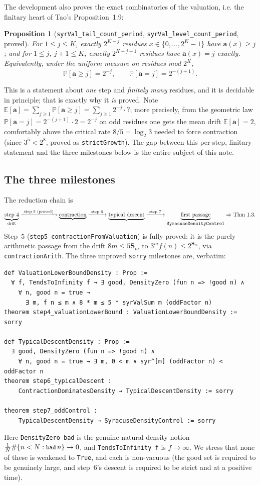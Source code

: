 \documentclass[11pt]{article}
\theoremstyle{plain}
\newtheorem{prop}[thm]{Proposition}
\theoremstyle{definition}
\theoremstyle{remark}
\newcommand{\aval}{\mathbf{a}}
\newcommand{\Ssum}{\mathbf{S}}
\newcommand{\E}{\mathbb{E}}
\newcommand{\Prob}{\mathbb{P}}
\newcommand{\code}[1]{\texttt{\small #1}}
\begin{document}
The development also proves the exact combinatorics of the valuation, i.e. the
finitary heart of Tao's Proposition~1.9:
\begin{prop}[\code{syrVal\_tail\_count\_period}, \code{syrVal\_level\_count\_period}, proved]
\label{prop:dist}
For $1\le j\le K$, exactly $2^{K-j}$ residues $x\in\{0,\dots,2^K-1\}$ have
$\aval(x)\ge j$; and for $1\le j$, $j+1\le K$, exactly $2^{K-j-1}$ residues have
$\aval(x)=j$ exactly. Equivalently, under the uniform measure on residues mod
$2^K$,
\[
  \Prob[\aval\ge j]=2^{-j},\qquad \Prob[\aval=j]=2^{-(j+1)}.
\]
\end{prop}
This is a statement about \emph{one} step and \emph{finitely many} residues, and
it is decidable in principle; that is exactly why it \emph{is} proved. Note
$\E[\aval]=\sum_{j\ge1}\Prob[\aval\ge j]=\sum_{j\ge 1}2^{-j}\cdot? $; more
precisely, from the geometric law $\Prob[\aval=j]=2^{-(j+1)}\cdot 2 = 2^{-j}$ on
odd residues one gets the mean drift $\E[\aval]=2$, comfortably above the
critical rate $8/5=\log_2 3$ needed to force contraction (since
$3^5<2^8$, proved as \code{strictGrowth}). The gap between this per-step,
finitary statement and the three milestones below is the entire subject of this
note.

\subsection{The three milestones}

The reduction chain is
\[
  \underbrace{\text{step 4}}_{\text{drift}}
  \xrightarrow{\ \text{step 5 (proved)}\ }
  \underbrace{\text{contraction}}_{}
  \xrightarrow{\ \text{step 6}\ }
  \underbrace{\text{typical descent}}_{}
  \xrightarrow{\ \text{step 7}\ }
  \underbrace{\text{first passage}}_{\text{\code{SyracuseDensityControl}}}
  \Rightarrow \text{Thm 1.3.}
\]
Step~5 (\code{step5\_contractionFromValuation}) is fully proved: it is the purely
arithmetic passage from the drift $8m\le 5\Ssum_m$ to
$3^m f(n)\le 2^{\Ssum_m}$, via \code{contractionArith}. The three unproved
\code{sorry} milestones are, verbatim:
\begin{lstlisting}
def ValuationLowerBoundDensity : Prop :=
  ∀ f, TendsToInfinity f → ∃ good, DensityZero (fun n => !good n) ∧
    ∀ n, good n = true →
      ∃ m, f n ≤ m ∧ 8 * m ≤ 5 * syrValSum m (oddFactor n)
theorem step4_valuationLowerBound : ValuationLowerBoundDensity := sorry

def TypicalDescentDensity : Prop :=
  ∃ good, DensityZero (fun n => !good n) ∧
    ∀ n, good n = true → ∃ m, 0 < m ∧ syr^[m] (oddFactor n) < oddFactor n
theorem step6_typicalDescent :
    ContractionDominatesDensity → TypicalDescentDensity := sorry

theorem step7_oddControl :
    TypicalDescentDensity → SyracuseDensityControl := sorry
\end{lstlisting}
Here \code{DensityZero bad} is the genuine natural-density notion
$\tfrac1N\#\{n<N: \code{bad}\,n\}\to 0$, and \code{TendsToInfinity f} is
$f\to\infty$. We stress that none of these is weakened to \code{True}, and each
is non-vacuous (the good set is required to be genuinely large, and step~6's
descent is required to be strict and at a positive time).
\end{document}
